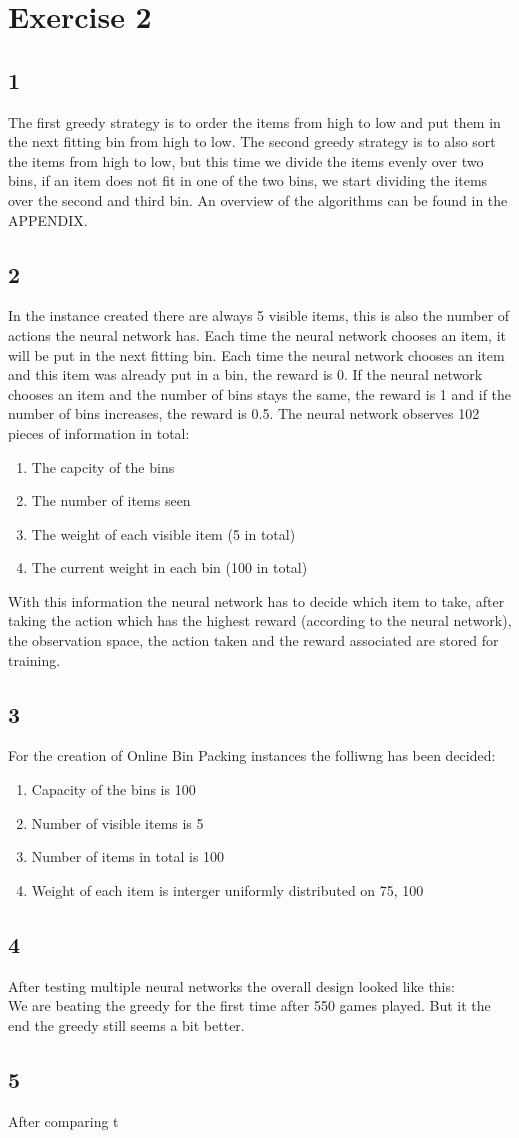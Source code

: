 \section*{Exercise 2}
\subsection*{1}
The first greedy strategy is to order the items from high to low and put them in the next fitting bin from high to low. The second greedy strategy is to also sort the items from high to low, but this time we divide the items evenly over two bins, if an item does not fit in one of the two bins, we start dividing the items over the second and third bin. An overview of the algorithms can be found in the APPENDIX.
\subsection*{2}
In the instance created there are always 5 visible items, this is also the number of actions the neural network has. Each time the neural network chooses an item, it will be put in the next fitting bin. Each time the neural network chooses an item and this item was already put in a bin, the reward is 0. If the neural network chooses an item and the number of bins stays the same, the reward is 1 and if the number of bins increases, the reward is 0.5. The neural network observes 102 pieces of information in total:
\begin{enumerate}
	\item The capcity of the bins
	\item The number of items seen
	\item The weight of each visible item (5 in total)
	\item The current weight in each bin (100 in total)
\end{enumerate}
With this information the neural network has to decide which item to take, after taking the action which has the highest reward (according to the neural network), the observation space, the action taken and the reward associated are stored for training. 
\subsection*{3}
For the creation of Online Bin Packing instances the folliwng has been decided:
\begin{enumerate}
	\item Capacity of the bins is 100
	\item Number of visible items is 5
	\item Number of items in total is 100
	\item Weight of each item is interger uniformly distributed on 75, 100
\end{enumerate}
\subsection*{4}
After testing multiple neural networks the overall design looked like this:\\
We are beating the greedy for the first time after 550 games played. But it the end the greedy still seems a bit better.
\subsection*{5}
After comparing t
